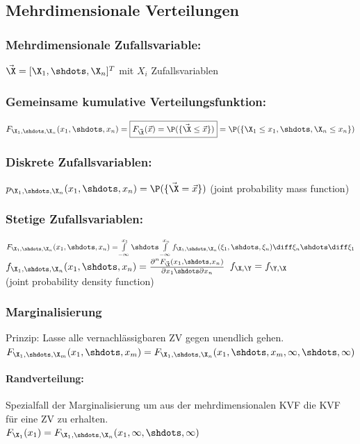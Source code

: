 \documentclass[german,color,6pt]{latex4ei/latex4ei_sheet}
\begin{document}
\begin{sectionbox}
	\subsection{Mehrdimensionale Verteilungen}
	\subsubsection{Mehrdimensionale Zufallsvariable:}
	$\vec{\X} = [\X_1,\shdots,\X_n]^T$ mit $X_i$ Zufallsvariablen
	\subsubsection{Gemeinsame kumulative Verteilungsfunktion:}
	$F_{\X_1,\shdots,\X_n}(x_1,\shdots,x_n) = \boxed{F_{\vec{\X}}(\vec{x}) = \P(\{\vec{\X} \leq \vec{x}\})} = \newline
	\P(\{\X_1 \leq x_1,\shdots,\X_n \leq x_n\})$
	\subsubsection{Diskrete Zufallsvariablen:}
	$p_{\X_1,\shdots,\X_n}(x_1,\shdots,x_n) = \P(\{\vec{\X} = \vec{x}\})$ (joint probability mass function)
	\subsubsection{Stetige Zufallsvariablen:}
	$F_{\X_1,\shdots,\X_n}(x_1,\shdots,x_n) =\! \int\limits_{-\infty}^{x_1}\shdots\int\limits_{-\infty}^{x_n}{f_{\X_1,\shdots,\X_n}(\xi_1,\shdots,\xi_n)\diff\xi_n\shdots\diff\xi_1}$\\
	$f_{\X_1,\shdots,\X_n}(x_1,\shdots,x_n) = \frac{\partial^n F_{\vec{\X}}(x_1,\shdots,x_n)}{\partial x_1\shdots\partial x_n}$ \hfill $f_{\X,\Y} = f_{\Y,\X}$\\
	(joint probability density function)

	\subsubsection{Marginalisierung}
	Prinzip: Lasse alle vernachlässigbaren ZV gegen unendlich gehen. \\
	$F_{\X_1,\shdots,\X_m}(x_1,\shdots,x_m) =
	F_{\X_1,\shdots,\X_n}(x_1,\shdots,x_m,\infty,\shdots,\infty)$
	\paragraph{Randverteilung:}
	Spezialfall der Marginalisierung um aus der mehrdimensionalen KVF die KVF für eine ZV zu erhalten. \\
	$F_{\X_1}(x_1) =
	F_{\X_1,\shdots,\X_n}(x_1,\infty,\shdots,\infty)$


\end{sectionbox}
\end{document}
